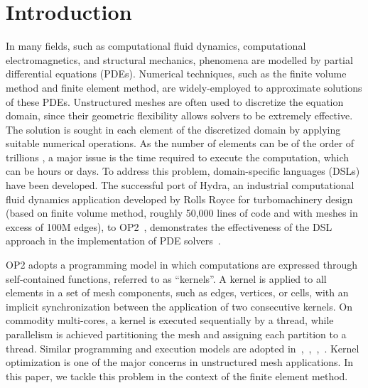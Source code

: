 \documentclass[conference]{IEEEtran}
\begin{document}
\section{Introduction}
In many fields, such as computational fluid dynamics, computational electromagnetics, and structural mechanics, phenomena are modelled by partial differential equations (PDEs). Numerical techniques, such as the finite volume method and finite element method, are widely-employed to approximate solutions of these PDEs. Unstructured meshes are often used to
discretize the equation domain, since their geometric flexibility allows solvers to be extremely effective. The solution is sought in each element of the discretized domain by applying suitable numerical operations. As the number of elements can be of the order of trillions \cite{Rossinelli2013}, a major issue is the time required to execute the computation, which can be hours or days. To address this problem, domain-specific languages (DSLs) have been developed. The successful port of Hydra, an industrial computational fluid dynamics application developed by Rolls Royce for turbomachinery design (based on finite volume method, roughly 50,000 lines of code and with meshes in excess of 100M edges), to OP2~\cite{op2-main}, demonstrates the effectiveness of the DSL approach in the implementation of PDE solvers~\cite{IstvanHydra}.

OP2 adopts a programming model in which computations are expressed through self-contained functions, referred to as ``kernels''. A kernel is applied to all elements in a set of mesh components, such as edges, vertices, or cells, with an implicit synchronization between the application of two consecutive kernels. On commodity multi-cores, a kernel is executed sequentially by a thread, while parallelism is achieved partitioning the mesh and assigning each partition to a thread. Similar programming and execution models are adopted in~\cite{pyop2isc},~\cite{Fenics},~\cite{fluidity_manual_v4},~\cite{lizst}. Kernel optimization is one of the major concerns in unstructured mesh applications. In this paper, we tackle this problem in the context of the finite element method.
\end{document}
